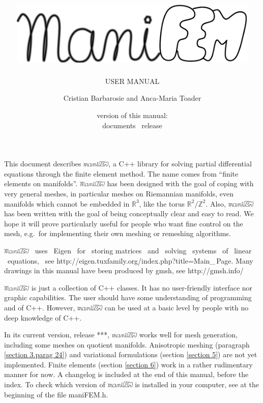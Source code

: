 \documentclass[a4paper]{scrreprt}
\title{\includegraphics[width=12cm]{manifem-grey-capital.eps}}
\subtitle{USER MANUAL}
\author{Cristian Barbarosie and Anca-Maria Toader}
\date{\small version of this manual: \manualversion\\ documents \maniFEM\ release \manifemrelease}
\def\manifemrelease{***}
\def\numb{}
\newcommand\ManiFEM{\leavevmode\hbox{\includegraphics[width=13mm]{manifem-large}}}
\newcommand\maniFEM{\leavevmode\hbox{\includegraphics[width=13mm]{manifem-small}}}
\renewcommand\tt{\normalfont\ttfamily}
\begin{document}
\begin{titlepage}
\maketitle
\end{titlepage}


\chapter*{}

This document describes \maniFEM, a {\tt C++} library for solving partial differential equations
through the finite element method.
The name comes from ``finite elements on manifolds''. 
{\ManiFEM} has been designed with the goal of coping with very general meshes,
in particular meshes on Riemannian manifolds, even manifolds which cannot be embedded
in $ {\mathbb R}^3 $, like the torus $ {\mathbb R}^2/{\mathbb Z}^2 $.
Also, {\maniFEM} has been written with the goal of being conceptually clear
and easy to read.
We hope it will prove particularly useful for people who want fine control on the mesh,
e.g.\ for implementing their own meshing or remeshing algorithms.

{\ManiFEM} \ uses \ {\tt Eigen} \ for \ storing matrices \ and \ solving \ systems \ of
\ linear \ equations, \ see {\small\tt http://eigen.tuxfamily.org/index.php?title=Main\_\,Page}.
Many drawings in this manual have been produced by {\tt gmsh}, see
{\small\tt http://gmsh.info/}

{\ManiFEM} is just a collection of {\tt C++} classes.
It has no user-friendly interface nor graphic capabilities.
The user should have some understanding of programming and of {\tt C++}.
However, {\maniFEM} can be used at a basic level by people with no deep knowledge of
{\tt C++}.

In its current version, release \manifemrelease, {\maniFEM} works well for mesh generation,
including some meshes on quotient manifolds.
Anisotropic meshing (paragraph \ref{\numb section 3.\numb parag 24}) and
variational formulations (section \ref{\numb section 5}) are not yet implemented.
Finite elements (section \ref{\numb section 6}) work in a rather rudimentary manner for now.
A changelog is included at the end of this manual, before the index.
To check which version of {\maniFEM} is installed in your computer,
see at the beginning of the file {\small\tt maniFEM.h}.
\end{document}
